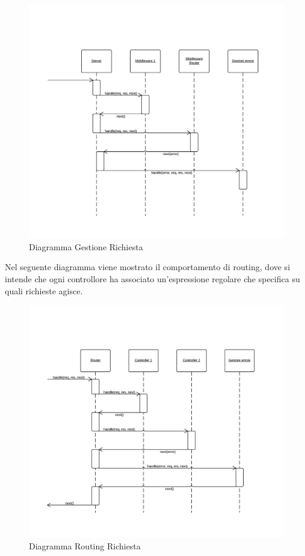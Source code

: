 \begin{figure}[H]
	\begin{center} 
		\includegraphics[scale=0.30]{scenari/Diagramma Gestione Richiesta.png}  
		\caption{Diagramma Gestione Richiesta}
	\end{center} 
\end{figure} 

Nel seguente diagramma viene mostrato il comportamento di routing, dove si intende che ogni controllore ha associato un'espressione regolare che specifica su quali richieste agisce.
\begin{figure}[H]
	\begin{center} 
		\includegraphics[scale=0.30]{scenari/Diagramma Routing Richiesta.png} 
		\caption{Diagramma Routing Richiesta}
	\end{center} 
\end{figure}

